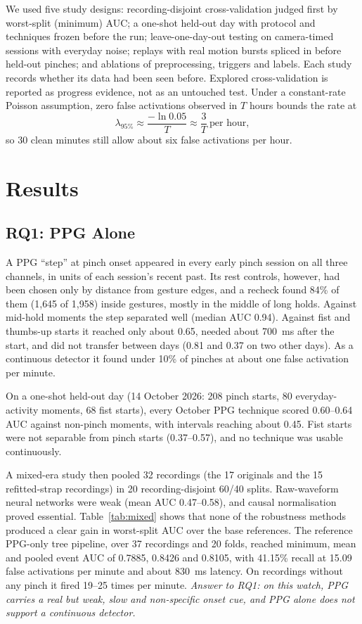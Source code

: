 We used five study designs: recording-disjoint cross-validation judged first by worst-split (minimum) AUC; a one-shot held-out day with protocol and techniques frozen before the run; leave-one-day-out testing on camera-timed sessions with everyday noise; replays with real motion bursts spliced in before held-out pinches; and ablations of preprocessing, triggers and labels. Each study records whether its data had been seen before. Explored cross-validation is reported as progress evidence, not as an untouched test. Under a constant-rate Poisson assumption, zero false activations observed in $T$ hours bounds the rate at
\begin{equation}
  \lambda_{95\%} \approx \frac{-\ln 0.05}{T} \approx \frac{3}{T}\ \text{per hour},
  \label{eq:poisson}
\end{equation}
so 30 clean minutes still allow about six false activations per hour.

\section{Results}\label{sec:results}

\subsection{RQ1: PPG Alone}

A PPG ``step'' at pinch onset appeared in every early pinch session on all three channels, in units of each session's recent past. Its rest controls, however, had been chosen only by distance from gesture edges, and a recheck found 84\% of them (1{,}645 of 1{,}958) inside gestures, mostly in the middle of long holds. Against mid-hold moments the step separated well (median AUC 0.94). Against fist and thumbs-up starts it reached only about 0.65, needed about 700~ms after the start, and did not transfer between days (0.81 and 0.37 on two other days). As a continuous detector it found under 10\% of pinches at about one false activation per minute.

On a one-shot held-out day (14 October 2026: 208 pinch starts, 80 everyday-activity moments, 68 fist starts), every October PPG technique scored 0.60--0.64 AUC against non-pinch moments, with intervals reaching about 0.45. Fist starts were not separable from pinch starts (0.37--0.57), and no technique was usable continuously.

A mixed-era study then pooled 32 recordings (the 17 originals and the 15 refitted-strap recordings) in 20 recording-disjoint 60/40 splits. Raw-waveform neural networks were weak (mean AUC 0.47--0.58), and causal normalisation proved essential. Table~\ref{tab:mixed} shows that none of the robustness methods produced a clear gain in worst-split AUC over the base references. The reference PPG-only tree pipeline, over 37 recordings and 20 folds, reached minimum, mean and pooled event AUC of 0.7885, 0.8426 and 0.8105, with 41.15\% recall at 15.09 false activations per minute and about 830~ms latency. On recordings without any pinch it fired 19--25 times per minute. \emph{Answer to RQ1: on this watch, PPG carries a real but weak, slow and non-specific onset cue, and PPG alone does not support a continuous detector.}

